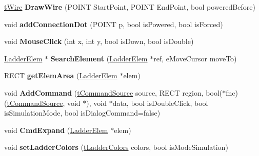 \begin{DoxyCompactItemize}
\item 
\hypertarget{class_ladder_g_u_i_a9a64f28b43d31216367327f298aa4b34}{\hyperlink{structt_wire}{t\-Wire} {\bfseries Draw\-Wire} (P\-O\-I\-N\-T Start\-Point, P\-O\-I\-N\-T End\-Point, bool powered\-Before)}\label{class_ladder_g_u_i_a9a64f28b43d31216367327f298aa4b34}

\item 
\hypertarget{class_ladder_g_u_i_af4fa1d4b562913cc18ae0616bdb7a6c7}{void {\bfseries add\-Connection\-Dot} (P\-O\-I\-N\-T p, bool is\-Powered, bool is\-Forced)}\label{class_ladder_g_u_i_af4fa1d4b562913cc18ae0616bdb7a6c7}

\item 
\hypertarget{class_ladder_g_u_i_a052750a31040fb8b7f82abf346e9ce74}{void {\bfseries Mouse\-Click} (int x, int y, bool is\-Down, bool is\-Double)}\label{class_ladder_g_u_i_a052750a31040fb8b7f82abf346e9ce74}

\item 
\hypertarget{class_ladder_g_u_i_a4e3d8b08d392f59bfc1f82f8bd55b95e}{\hyperlink{class_ladder_elem}{Ladder\-Elem} $\ast$ {\bfseries Search\-Element} (\hyperlink{class_ladder_elem}{Ladder\-Elem} $\ast$ref, e\-Move\-Cursor move\-To)}\label{class_ladder_g_u_i_a4e3d8b08d392f59bfc1f82f8bd55b95e}

\item 
\hypertarget{class_ladder_g_u_i_a1874723313539566c551d3d30fcecf67}{R\-E\-C\-T {\bfseries get\-Elem\-Area} (\hyperlink{class_ladder_elem}{Ladder\-Elem} $\ast$elem)}\label{class_ladder_g_u_i_a1874723313539566c551d3d30fcecf67}

\item 
\hypertarget{class_ladder_g_u_i_a4d839417f15ecd7348ff857a8c95da2f}{void {\bfseries Add\-Command} (\hyperlink{structt_command_source}{t\-Command\-Source} source, R\-E\-C\-T region, bool($\ast$fnc)(\hyperlink{structt_command_source}{t\-Command\-Source}, void $\ast$), void $\ast$data, bool is\-Double\-Click, bool is\-Simulation\-Mode, bool is\-Dialog\-Command=false)}\label{class_ladder_g_u_i_a4d839417f15ecd7348ff857a8c95da2f}

\item 
\hypertarget{class_ladder_g_u_i_ad38f2b4e99a87eb6f8c36bb417fba746}{void {\bfseries Cmd\-Expand} (\hyperlink{class_ladder_elem}{Ladder\-Elem} $\ast$elem)}\label{class_ladder_g_u_i_ad38f2b4e99a87eb6f8c36bb417fba746}

\item 
\hypertarget{class_ladder_g_u_i_a90c2a03c8c81b76b4ae620decc996ead}{void {\bfseries set\-Ladder\-Colors} (\hyperlink{structt_ladder_colors}{t\-Ladder\-Colors} colors, bool is\-Mode\-Simulation)}\label{class_ladder_g_u_i_a90c2a03c8c81b76b4ae620decc996ead}


\end{DoxyCompactItemize}
